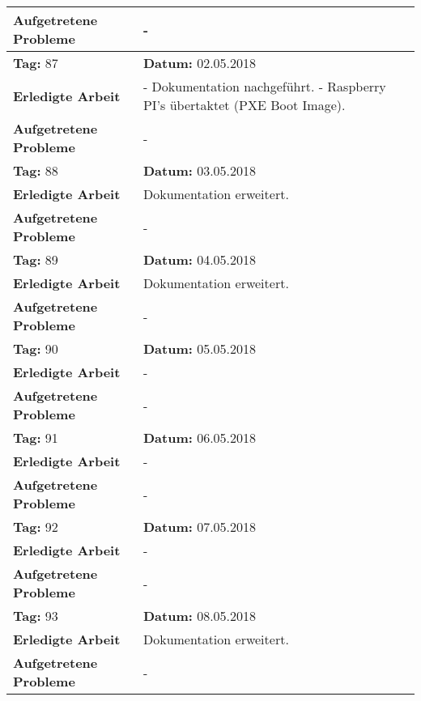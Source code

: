 \begin{longtable}{|p{5cm}|p{5cm}p{6cm}|}
\textbf{Aufgetretene Probleme} & \multicolumn{2}{p{11cm}|}{-} \\ \hline
\rowcolor{heading}\textbf{Tag:} 87 & \textbf{Datum:} 02.05.2018 & \\ \hline
\textbf{Erledigte Arbeit} & \multicolumn{2}{p{11cm}|}{- Dokumentation nachgeführt. \newline
- Raspberry PI's übertaktet (PXE Boot Image).} \\ \hline
\textbf{Aufgetretene Probleme} & \multicolumn{2}{p{11cm}|}{-} \\ \hline
\rowcolor{heading}\textbf{Tag:} 88 & \textbf{Datum:} 03.05.2018 & \\ \hline
\textbf{Erledigte Arbeit} & \multicolumn{2}{p{11cm}|}{Dokumentation erweitert.} \\ \hline
\textbf{Aufgetretene Probleme} & \multicolumn{2}{p{11cm}|}{-} \\ \hline
\rowcolor{heading}\textbf{Tag:} 89 & \textbf{Datum:} 04.05.2018 & \\ \hline
\textbf{Erledigte Arbeit} & \multicolumn{2}{p{11cm}|}{Dokumentation erweitert.} \\ \hline
\textbf{Aufgetretene Probleme} & \multicolumn{2}{p{11cm}|}{-} \\ \hline
\rowcolor{heading}\textbf{Tag:} 90 & \textbf{Datum:} 05.05.2018 & \\ \hline
\textbf{Erledigte Arbeit} & \multicolumn{2}{p{11cm}|}{-} \\ \hline
\textbf{Aufgetretene Probleme} & \multicolumn{2}{p{11cm}|}{-} \\ \hline
\rowcolor{heading}\textbf{Tag:} 91 & \textbf{Datum:} 06.05.2018 & \\ \hline
\textbf{Erledigte Arbeit} & \multicolumn{2}{p{11cm}|}{-} \\ \hline
\textbf{Aufgetretene Probleme} & \multicolumn{2}{p{11cm}|}{-} \\ \hline
\rowcolor{heading}\textbf{Tag:} 92 & \textbf{Datum:} 07.05.2018 & \\ \hline
\textbf{Erledigte Arbeit} & \multicolumn{2}{p{11cm}|}{-} \\ \hline
\textbf{Aufgetretene Probleme} & \multicolumn{2}{p{11cm}|}{-} \\ \hline
\rowcolor{heading}\textbf{Tag:} 93 & \textbf{Datum:} 08.05.2018 & \\ \hline
\textbf{Erledigte Arbeit} & \multicolumn{2}{p{11cm}|}{Dokumentation erweitert.} \\ \hline
\textbf{Aufgetretene Probleme} & \multicolumn{2}{p{11cm}|}{-} \\ \hline

\end{longtable}
